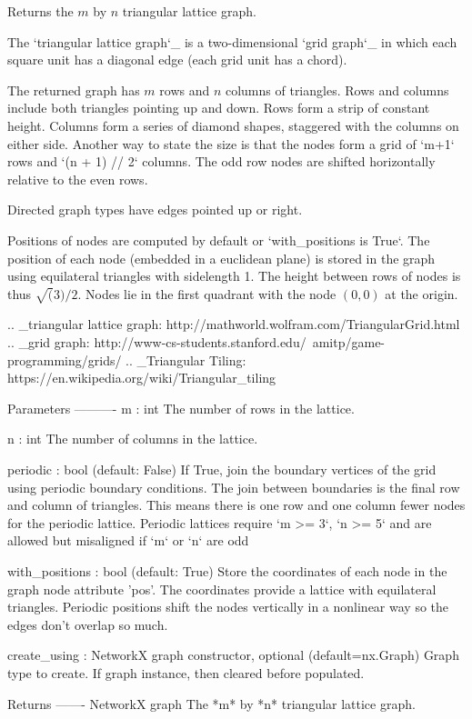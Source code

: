 \begin{DoxyVerb}Returns the $m$ by $n$ triangular lattice graph.

The `triangular lattice graph`_ is a two-dimensional `grid graph`_ in
which each square unit has a diagonal edge (each grid unit has a chord).

The returned graph has $m$ rows and $n$ columns of triangles. Rows and
columns include both triangles pointing up and down. Rows form a strip
of constant height. Columns form a series of diamond shapes, staggered
with the columns on either side. Another way to state the size is that
the nodes form a grid of `m+1` rows and `(n + 1) // 2` columns.
The odd row nodes are shifted horizontally relative to the even rows.

Directed graph types have edges pointed up or right.

Positions of nodes are computed by default or `with_positions is True`.
The position of each node (embedded in a euclidean plane) is stored in
the graph using equilateral triangles with sidelength 1.
The height between rows of nodes is thus $\sqrt(3)/2$.
Nodes lie in the first quadrant with the node $(0, 0)$ at the origin.

.. _triangular lattice graph: http://mathworld.wolfram.com/TriangularGrid.html
.. _grid graph: http://www-cs-students.stanford.edu/~amitp/game-programming/grids/
.. _Triangular Tiling: https://en.wikipedia.org/wiki/Triangular_tiling

Parameters
----------
m : int
    The number of rows in the lattice.

n : int
    The number of columns in the lattice.

periodic : bool (default: False)
    If True, join the boundary vertices of the grid using periodic
    boundary conditions. The join between boundaries is the final row
    and column of triangles. This means there is one row and one column
    fewer nodes for the periodic lattice. Periodic lattices require
    `m >= 3`, `n >= 5` and are allowed but misaligned if `m` or `n` are odd

with_positions : bool (default: True)
    Store the coordinates of each node in the graph node attribute 'pos'.
    The coordinates provide a lattice with equilateral triangles.
    Periodic positions shift the nodes vertically in a nonlinear way so
    the edges don't overlap so much.

create_using : NetworkX graph constructor, optional (default=nx.Graph)
    Graph type to create. If graph instance, then cleared before populated.

Returns
-------
NetworkX graph
    The *m* by *n* triangular lattice graph.
\end{DoxyVerb}
 
